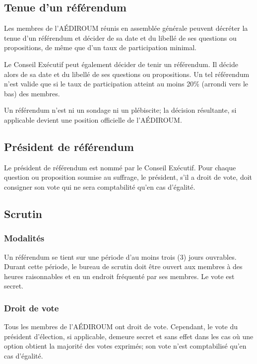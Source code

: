 \documentclass{aediroum}
\begin{document}
\subsection{Tenue d'un référendum}\label{sec:tenue-dun-referendum}
Les membres de l'AÉDIROUM réunis en assemblée générale peuvent décréter la tenue d'un référendum et décider de sa date et du libellé de ses questions ou propositions, de même que d'un taux de participation minimal.

Le Conseil Exécutif peut également décider de tenir un référendum. Il décide alors de sa date et du libellé de ses questions ou propositions. Un tel référendum n'est valide que si le taux de participation atteint au moins 20\% (arrondi vers le bas) des membres.

Un référendum n'est ni un sondage ni un plébiscite; la décision résultante, si applicable devient une position officielle de l'AÉDIROUM.

\subsection{Président de référendum}\label{sec:president-de-referendum}
Le président de référendum est nommé par le Conseil Exécutif. Pour chaque question ou proposition soumise au suffrage, le président, s'il a droit de vote, doit consigner son vote qui ne sera comptabilité qu'en cas d'égalité.

\subsection{Scrutin}\label{sec:scrutin}
\subsubsection{Modalités}\label{sec:modalites-scrutin}

Un référendum se tient sur une période d'au moins trois (3) jours ouvrables. Durant cette période, le bureau de scrutin doit être ouvert aux membres à des heures raisonnables et en un endroit fréquenté par ses membres. Le vote est secret.

\subsubsection{Droit de vote}\label{sec:droit-de-vote}

Tous les membres de l'AÉDIROUM ont droit de vote. Cependant, le vote du président d'élection, si applicable, demeure secret et sans effet dans les cas où une option obtient la majorité des votes exprimés; son vote n'est comptabilisé qu'en cas d'égalité.
\end{document}
